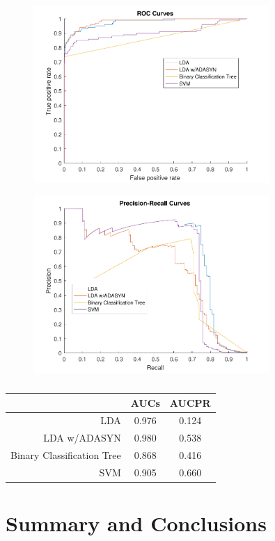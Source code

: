 \documentclass{article}
\begin{document}
\begin{figure}[!htb]
	\centering
	\includegraphics[width=0.8\textwidth]{ROC}
	\caption{}
	\label{fig:roc}
\end{figure}
\begin{figure}[!htb]
	\centering
	\includegraphics[width=0.8\textwidth]{PR}
	\caption{}
	\label{fig:pr}
\end{figure}

\begin{table}[!htb]
	\centering
	\caption{}
	\label{tab:area}
	\begin{tabular}{r|c|c}
		& AUCs & AUCPR \\
		\hline
		LDA & 0.976 & 0.124 \\
		LDA w/ADASYN & 0.980 & 0.538 \\
		Binary Classification Tree  & 0.868 & 0.416 \\
		SVM & 0.905 & 0.660
	\end{tabular}
\end{table}

\section{Summary and Conclusions}
\end{document}
